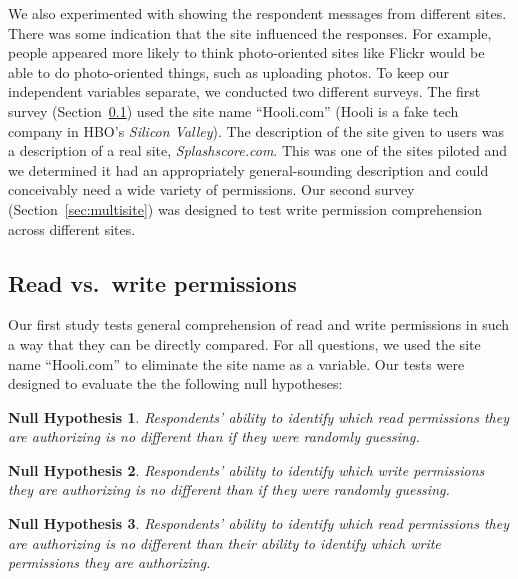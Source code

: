 \documentclass{sig-alternate}
\newtheorem{hypothesis}{Null Hypothesis}
\newcommand{\extendedversion}[2]{#2}
\begin{document}
We also experimented with showing the respondent messages from different sites. There was some indication that the site influenced the responses. For example, people appeared more likely to think photo-oriented sites like Flickr would be able to do photo-oriented things, such as uploading photos. To keep our independent variables separate, we conducted two different surveys. The first survey (Section~\ref{sec:comparisonsurvey}) used the site name ``Hooli.com'' (Hooli is a fake tech company in HBO's \emph{Silicon Valley}). The description of the site given to users was a description of a real site, \emph{Splashscore.com}. This was one of the sites piloted and we determined it had an appropriately general-sounding description and could conceivably need a wide variety of permissions. \extendedversion{The way the site was presented to users can be seen in Appendix~\ref{appendix:surveys}.}{} Our second survey (Section~\ref{sec:multisite}) was designed to test write permission comprehension across different sites.

\subsection{Read vs.\ write permissions}
\label{sec:comparisonsurvey}

Our first study tests general comprehension of read and write permissions in such a way that they can be directly compared. For all questions, we used the site name ``Hooli.com'' to eliminate the site name as a variable. Our tests were designed to evaluate the the following null hypotheses:

\begin{hypothesis}\label{hyp:read_equals_random}
Respondents' ability to identify which read permissions they are authorizing is no different than if they were randomly guessing.
\end{hypothesis}
\begin{hypothesis}\label{hyp:write_equals_random}
Respondents' ability to identify which write permissions they are authorizing is no different than if they were randomly guessing.
\end{hypothesis}
\begin{hypothesis}\label{hyp:read_equals_write}
Respondents' ability to identify which read permissions they are authorizing is no different than their ability to identify which write permissions they are authorizing.
\end{hypothesis}
\end{document}
